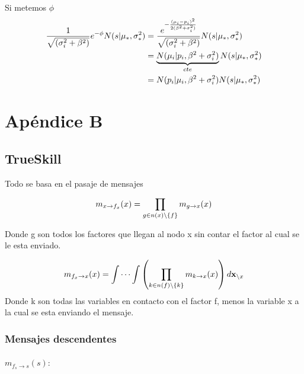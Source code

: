 \documentclass[11pt,twoside,spanish]{report} %
\begin{document}
Si metemos $\phi$
\begin{equation}
	\centering
	\begin{split}
		\frac{1}{\sqrt{(\sigma_i^2+\beta^2)}}e^{-\phi}N(s \vert\mu_{\ast},\sigma_{\ast}^2)
		& =\frac{e^{-\frac{(\mu_i-p_i)^2}{2(\beta^2+\sigma_i^2)}}}{\sqrt{(\sigma_i^2+\beta^2)}}N(s \vert\mu_{\ast},\sigma_{\ast}^2)\\
		& = \underbrace{N(\mu_i\vert p_i,\beta^2+\sigma_i^2)}_{cte}N(s \vert\mu_{\ast},\sigma_{\ast}^2)\\
		& = N(p_i\vert \mu_i,\beta^2+\sigma_i^2)N(s \vert\mu_{\ast},\sigma_{\ast}^2)
	\end{split}
\end{equation}











\chapter{Ap\'endice B}
\section{TrueSkill}


Todo se basa en el pasaje de mensajes

\begin{equation}
	\centering
	m_{x\rightarrow f_{x}}(x) = \prod_{g\in n(x)\backslash\{f\}}m_{g\rightarrow x}(x)
\end{equation}

Donde g son todos los factores que llegan al nodo x sin contar el factor al cual se le esta enviado.

\begin{equation}
	\centering
	m_{f_{x}\rightarrow x}(x) = \int\cdots\int\left(\prod_{k\in n(f)\backslash\{k\}}m_{k\rightarrow x}(x)\right)d\textbf{x}_{\backslash x}
\end{equation}
Donde k son todas las variables en contacto con el factor f, menos la variable x a la cual se esta enviando el mensaje.

\subsection{Mensajes descendentes}
\label{appendix:mensajes}
\paragraph{$m_{f_{s}\rightarrow s}(s):$}
\end{document}
